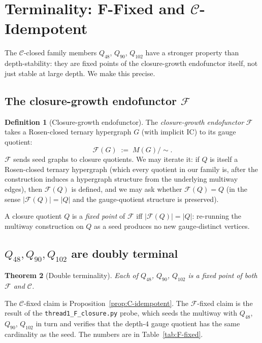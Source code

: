 \documentclass[12pt,a4paper]{article}
\newtheorem{theorem}{Theorem}[section]
\theoremstyle{definition}
\newtheorem{definition}[theorem]{Definition}
\theoremstyle{remark}
\newcommand{\Ccls}{\mathcal{C}}             %
\newcommand{\Fcls}{\mathcal{F}}             %
\begin{document}
\section{Terminality: F-Fixed and $\Ccls$-Idempotent}\label{sec:terminality}

The $\Ccls$-closed family members $Q_{48}$, $Q_{90}$, $Q_{102}$ have
a stronger property than depth-stability: they are fixed points of
the closure-growth endofunctor itself, not just stable at large depth.
We make this precise.

\subsection{The closure-growth endofunctor $\Fcls$}\label{sec:term-functor}

\begin{definition}[Closure-growth endofunctor]\label{def:F}
The \emph{closure-growth endofunctor} $\Fcls$ takes a Rosen-closed
ternary hypergraph $G$ (with implicit IC) to its gauge quotient:
\[
\Fcls(G) \;:=\; M(G) / {\sim}.
\]
$\Fcls$ sends seed graphs to closure quotients. We may iterate it: if
$Q$ is itself a Rosen-closed ternary hypergraph (which every quotient
in our family is, after the construction induces a hypergraph
structure from the underlying multiway edges), then $\Fcls(Q)$ is
defined, and we may ask whether $\Fcls(Q) = Q$ (in the sense
$|\Fcls(Q)| = |Q|$ and the gauge-quotient structure is preserved).
\end{definition}

A closure quotient $Q$ is a \emph{fixed point} of $\Fcls$ iff
$|\Fcls(Q)| = |Q|$: re-running the multiway construction on $Q$ as a
seed produces no new gauge-distinct vertices.

\subsection{$Q_{48}, Q_{90}, Q_{102}$ are doubly terminal}
\label{sec:term-doubly}

\begin{theorem}[Double terminality]\label{thm:double-terminal}
Each of $Q_{48}$, $Q_{90}$, $Q_{102}$ is a fixed point of both
$\Fcls$ and $\Ccls$.
\end{theorem}

The $\Ccls$-fixed claim is Proposition~\ref{prop:C-idempotent}. The
$\Fcls$-fixed claim is the result of the
\texttt{thread1\_F\_closure.py} probe, which seeds the multiway with
$Q_{48}$, $Q_{90}$, $Q_{102}$ in turn and verifies that the depth-$4$
gauge quotient has the same cardinality as the seed. The numbers are
in Table~\ref{tab:F-fixed}.
\end{document}
